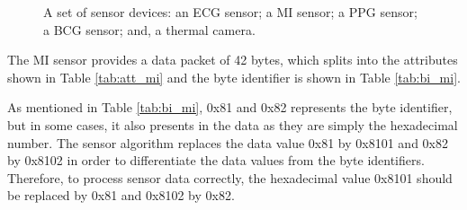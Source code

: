 \begin{figure}
	\hspace{8pt}%
	\caption[A set of sensor devices.]{A set of sensor devices:
		 an ECG sensor;
		 a MI sensor;
		 a PPG sensor;
		 a BCG sensor; and,
		 a thermal camera.}%
	\label{fig:ex3}%
\end{figure}



The MI sensor provides a data packet of 42 bytes, which splits into the attributes shown in Table \ref{tab:att_mi} and the byte identifier is shown in Table \ref{tab:bi_mi}.


As mentioned in Table \ref{tab:bi_mi}, 0x81 and 0x82 represents the byte identifier, but in some cases, it also presents in the data as they are simply the hexadecimal number. The sensor algorithm replaces the data value 0x81 by 0x8101 and 0x82 by 0x8102 in order to differentiate the data values from the byte identifiers. Therefore, to process sensor data correctly, the hexadecimal value 0x8101 should be replaced by 0x81 and 0x8102 by 0x82.

